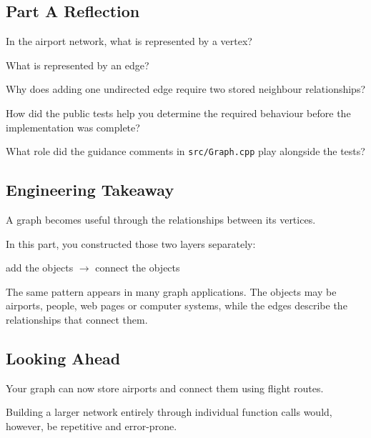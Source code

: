 \documentclass{csc2059practical}
\begin{document}
\subsection{Part A Reflection}

\begin{reflectionbox}
In the airport network, what is represented by a vertex?

What is represented by an edge?

Why does adding one undirected edge require two stored neighbour relationships?

How did the public tests help you determine the required behaviour before the
implementation was complete?

What role did the guidance comments in \texttt{src/Graph.cpp} play alongside
the tests?
\end{reflectionbox}

\subsection{Engineering Takeaway}

\begin{importantnote}
A graph becomes useful through the relationships between its vertices.

In this part, you constructed those two layers separately:

\begin{center}
add the objects
$\rightarrow$
connect the objects
\end{center}

The same pattern appears in many graph applications. The objects may be
airports, people, web pages or computer systems, while the edges describe the
relationships that connect them.
\end{importantnote}


\subsection{Looking Ahead}

Your graph can now store airports and connect them using flight routes.

Building a larger network entirely through individual function calls would,
however, be repetitive and error-prone.
\end{document}
